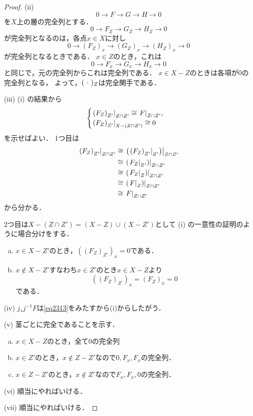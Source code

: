\begin{proof}
    (ii) 
    \[
        0\to F\to G\to H\to 0
    \]を\(X\)上の層の完全列とする．
    \[
        0\to F_Z\to G_Z\to H_Z\to 0
    \]が完全列となるのは，各点\(x\in X\)に対し
    \[
        0\to (F_Z)_x\to (G_Z)_x\to (H_Z)_x\to 0
    \]が完全列となるときである．
    \(x\in Z\)のとき，これは\[
        0\to F_x\to G_x\to H_x\to 0
    \]と同じで，元の完全列からこれは完全列である．
    \(x\in X-Z\)のときは各項が0の完全列となる，
    よって，\((\blk)_Z\)は完全関手である．

    (iii) 
    (i) の結果から\[
        \begin{cases}
            \mres[\left(F_Z\right)_{Z'}]{Z\cap Z'}\cong \mres[F]{Z\cap Z'},\\
            \mres[\left(F_Z\right)_{Z'}]{X-(Z\cap Z')}\cong 0
        \end{cases}
    \]を示せばよい．
    1つ目は\begin{align*}
        \mres[\left(F_Z\right)_{Z'}]{Z\cap Z'}
        &\cong \mres[{\left(\mres[\left(F_Z\right)_{Z'}]{Z'}\right)}]{Z\cap Z'}\\
        &\cong \mres[{\left(\mres[F_Z]{Z'}\right)}]{Z\cap Z'}\\
        &\cong \mres[{\left(\mres[F_Z]{Z}\right)}]{Z\cap Z'}\\
        &\cong \mres[{\left(\mres[F]{Z}\right)}]{Z\cap Z'}\\
        &\cong \mres[F]{Z\cap Z'}
    \end{align*}
    から分かる．

    2つ目は\(X-\left(Z\cap Z'\right)=(X-Z)\cup(X-Z')\)として
    (i) の一意性の証明のように場合分けをする．
    \begin{enumerate}[(a)]\setlength{\leftskip}{3zw}
        \item \(x\in X-Z'\)のとき，\(\left(\left(F_Z\right)_{Z'}\right)_x=0\)である．
        \item \(x\notin X-Z'\)すなわち\(x\in Z'\)のとき\(x\in X-Z\)より\[
            \left(\left(F_Z\right)_{Z'}\right)_x
            =\left(F_Z\right)_x=0    
        \]である．
    \end{enumerate}
    
    (iv) 
    \(j_{\ast}j^{-1}F\)は\eqref{eq2313}をみたすから(i)からしたがう．

    (v) 茎ごとに完全であることを示す．\begin{enumerate}[(a)]\setlength{\leftskip}{3zw}
        \item \(x\in X-Z\)のとき，全て0の完全列
        \item \(x\in Z'\)のとき，\(x\notin Z- Z'\)なので\(0,F_x,F_x\)の完全列．
        \item \(x\in Z-Z'\)のとき，\(x\notin Z'\)なので\(F_x,F_x,0\)の完全列．
    \end{enumerate}

    (vi) 
    順当にやればいける．

    (vii)
    順当にやればいける．
\end{proof}

